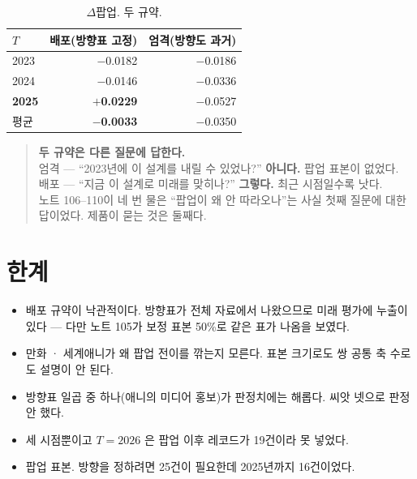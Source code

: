 \documentclass[10pt]{article}
\begin{document}
\begin{table}[t]
\centering\tsize
\caption{$\Delta$팝업. 두 규약.}
\begin{tabular}{lrr}
\toprule
$T$ & 배포(방향표 고정) & 엄격(방향도 과거) \\
\midrule
2023 & $-$0.0182 & $-$0.0186 \\
2024 & $-$0.0146 & $-$0.0336 \\
\textbf{2025} & \textbf{$+$0.0229} & $-$0.0527 \\
\midrule
평균 & \textbf{$-$0.0033} & $-$0.0350 \\
\bottomrule
\end{tabular}
\end{table}


\begin{quote}\fontsize{9.5}{11.5}\selectfont
\textbf{두 규약은 다른 질문에 답한다.}\\[.3em]
엄격 --- ``2023년에 이 설계를 내릴 수 있었나?'' \textbf{아니다.} 팝업 표본이
없었다.\\[.2em]
배포 --- ``지금 이 설계로 미래를 맞히나?'' \textbf{그렇다.} 최근 시점일수록
낫다.\\[.3em]
노트 106--110이 네 번 물은 ``팝업이 왜 안 따라오나''는 사실 첫째 질문에
대한 답이었다. 제품이 묻는 것은 둘째다.
\end{quote}

\section{한계}

\begin{itemize}[leftmargin=1.1em,itemsep=0.15em]
\item 배포 규약이 낙관적이다. 방향표가 전체 자료에서 나왔으므로 미래
      평가에 누출이 있다 --- 다만 노트 105가 보정 표본 50\%로 같은 표가
      나옴을 보였다.
\item 만화 · 세계애니가 왜 팝업 전이를 깎는지 모른다. 표본 크기로도 쌍 공통
      축 수로도 설명이 안 된다.
\item 방향표 일곱 중 하나(애니의 미디어 홍보)가 판정치에는 해롭다. 씨앗 넷으로
      판정 안 했다.
\item 세 시점뿐이고 $T{=}2026$ 은 팝업 이후 레코드가 19건이라 못 넣었다.
\item 팝업 표본. 방향을 정하려면 25건이 필요한데 2025년까지 16건이었다.
\end{itemize}
\end{document}
